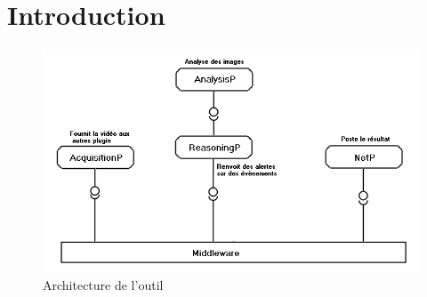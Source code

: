 \chapter{Introduction}
   \begin{figure}[htbp]
  \centering
  \includegraphics[scale=0.70]{img/archi}
  \caption{Architecture de l'outil}
  \label{fig:archi}
\end{figure}
